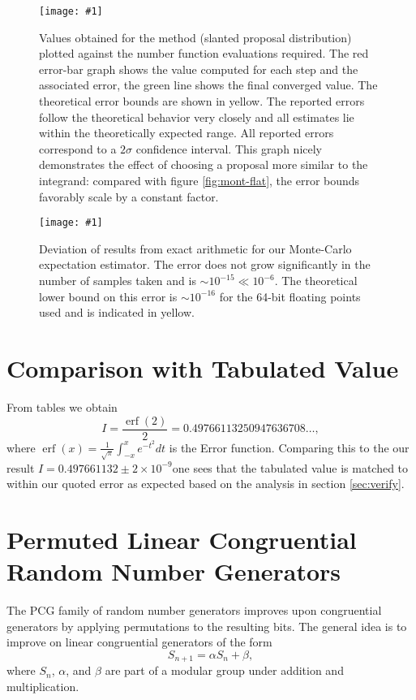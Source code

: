 \documentclass[10pt, a4paper]{article}
\newcommand{\plot}[3]{\begin{figure}[htp]\centering\texttt{[image: \#1]}\caption{#2}\label{#3}\end{figure}}
\newcommand{\finalval}{0.497661132 \pm 2\times10^{-9}}
\newcommand{\final}{$I = \finalval$}
\begin{document}
  \plot{proj-mont-slanted-accuracy}{
    Values obtained for the \is{} method (slanted proposal distribution) plotted against the number
    function evaluations required. The red
    error-bar graph shows the value computed for each step and the associated error, the green line
    shows the final converged value. The theoretical error bounds are shown in yellow. The reported errors
    follow the theoretical behavior very closely and all estimates lie within the theoretically expected range.
    All reported errors correspond to a $2\sigma$ confidence interval. This graph nicely demonstrates the
    effect of choosing a proposal more similar to the integrand: compared with figure \ref{fig:mont-flat},
    the error bounds favorably scale by a constant factor.
  }{fig:mont-slant}

  \plot{proj-mont-stab}{
    Deviation of results from exact arithmetic for our Monte-Carlo expectation estimator. The error
    does not grow significantly in the
    number of samples taken and is $\sim 10^{-15} \ll 10^{-6}$. The theoretical lower bound on this
    error is $\sim 10^{-16}$ for the 64-bit floating points used and is indicated in yellow.
  }{fig:float-error}

\pagebreak
{}


\appendix{}

\section{Comparison with Tabulated Value}
\label{app:cheat}
From tables we obtain
\begin{equation}
I = \frac{\operatorname{erf}(2)}{2} = 0.49766113250947636708 \dots,
\end{equation}
where $\operatorname{erf}(x) = \frac{1}{\sqrt\pi}\int_{-x}^x e^{-t^2} dt$ is the Error function. Comparing
this to the our result \final one sees that the tabulated value is matched to within our
quoted error as expected based on the analysis in section \ref{sec:verify}.

\section{Permuted Linear Congruential Random Number Generators}
\label{app:pcg}

The PCG family of random number generators improves upon congruential generators by applying
permutations to the resulting bits\cite{pcg}. The general idea is to improve on linear congruential
generators of the form
\begin{equation}
S_{n+1} = \alpha S_n + \beta,
\end{equation}
where $S_n$, $\alpha$, and $\beta$ are part of a modular group under addition and multiplication.
\end{document}
